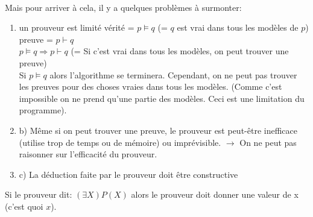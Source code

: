 \paragraph{}
Mais pour arriver à cela, il y a quelques problèmes à surmonter:
\begin{enumerate}
	\item un prouveur est limité
		vérité = $ p \models q $ (= $ q $ est vrai dans tous les modèles de $ p $)\\
		preuve = $ p  \vdash q $ \\
		$ p \models q \Rightarrow p \vdash q $ (= Si c’est vrai dans tous les modèles, on peut trouver une preuve)\\
		Si $ p \models q $ alors l’algorithme se terminera. Cependant, on ne peut pas trouver les preuves pour des choses vraies dans tous les modèles. (Comme c’est impossible on ne prend qu’une partie des modèles. Ceci est une limitation du programme).
		
		\item b) Même si on peut trouver une preuve, le prouveur est peut-être inefficace (utilise trop de temps ou de mémoire) ou imprévisible. $ \to $ On ne peut pas raisonner sur l’efficacité du prouveur.
		
		\item c) La déduction faite par le prouveur doit être constructive  
\end{enumerate}

		Si le prouveur dit: $ (\exists X) P(X) $  alors le prouveur doit donner une valeur de x (c’est quoi $ x $).



